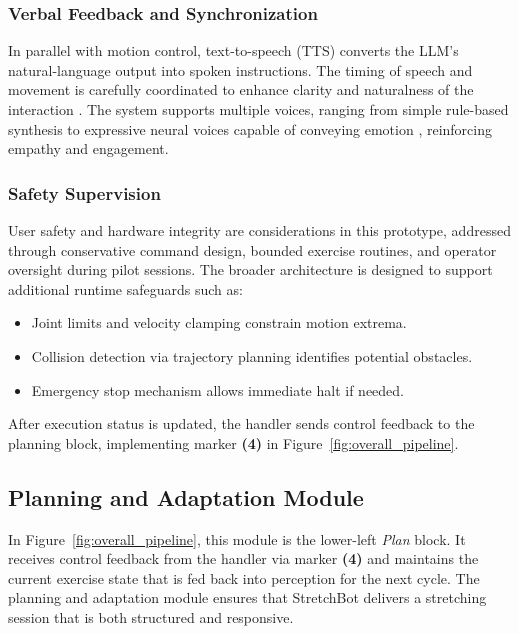 \documentclass[pdflatex,sn-basic,Numbered,iicol,twocolumn]{sn-jnl}%
\begin{document}
\subsubsection{Verbal Feedback and Synchronization}
In parallel with motion control, text-to-speech (TTS) converts the LLM's natural-language output into spoken instructions. The timing of speech and movement is carefully coordinated to enhance clarity and naturalness of the interaction \cite{Breazeal2000}. The system supports multiple voices, ranging from simple rule-based synthesis to expressive neural voices capable of conveying emotion \cite{VanDenOord2016}, reinforcing empathy and engagement.

\subsubsection{Safety Supervision}
User safety and hardware integrity are considerations in this prototype, addressed through conservative command design, bounded exercise routines, and operator oversight during pilot sessions. The broader architecture is designed to support additional runtime safeguards such as:
\begin{itemize}
\item Joint limits and velocity clamping constrain motion extrema.
\item Collision detection via trajectory planning identifies potential obstacles.
\item Emergency stop mechanism allows immediate halt if needed.
\end{itemize}

After execution status is updated, the handler sends control feedback to the planning block, implementing marker \textbf{(4)} in Figure~\ref{fig:overall_pipeline}.

\subsection{Planning and Adaptation Module}

In Figure~\ref{fig:overall_pipeline}, this module is the lower-left \textit{Plan} block. It receives control feedback from the handler via marker \textbf{(4)} and maintains the current exercise state that is fed back into perception for the next cycle. The planning and adaptation module ensures that StretchBot delivers a stretching session that is both structured and responsive.
\end{document}
